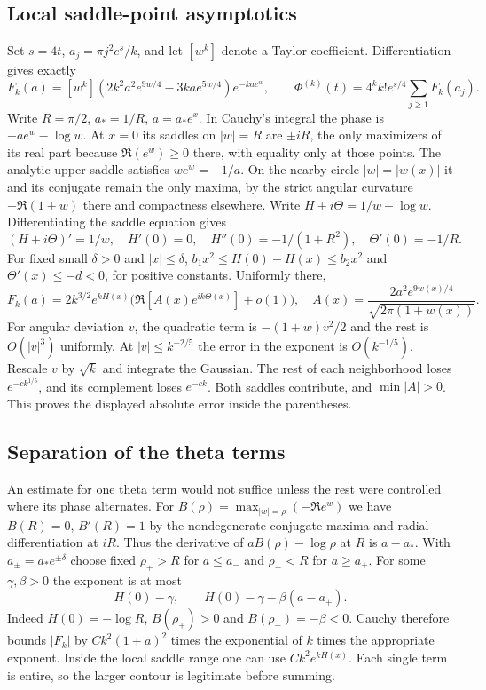 \documentclass[11pt,a4paper,reqno]{amsart}
\numberwithin{equation}{section}
\begin{document}
\subsection{Local saddle-point asymptotics}\label{sec:saddle}


Set \(s=4t\), \(a_j=\pi j^2 e^s/k\), and let \([w^k]\) denote a Taylor coefficient. Differentiation gives exactly \[ F_k(a)=[w^k](2k^2a^2 e^{9w/4}-3ka e^{5w/4})e^{-kae^w},\qquad
\Phi^{(k)}(t)=4^k k! e^{s/4}\sum_{j\ge1}F_k(a_j).\] Write \(R=\pi/2\), \(a_*=1/R\), \(a=a_*e^x\). In Cauchy's integral the phase is \(-ae^w-\log w\). At \(x=0\) its saddles on \(|w|=R\) are \(\pm iR\), the only maximizers of its real part because \(\Re(e^w)\ge0\) there, with equality only at those points. The analytic upper saddle satisfies \(we^w=-1/a\). On the nearby circle \(|w|=|w(x)|\) it and its conjugate remain the only maxima, by the strict angular curvature \(-\Re(1+w)\) there and compactness elsewhere. Write \(H+i\Theta=1/w-\log w\). Differentiating the saddle equation gives \[(H+i\Theta)'=1/w,\quad H'(0)=0,\quad H''(0)=-1/(1+R^2),\quad \Theta'(0)=-1/R.\] For fixed small \(\delta>0\) and \(|x|\le\delta\), \(b_1x^2\le H(0)-H(x)\le b_2x^2\) and \(\Theta'(x)\le-d<0\), for positive constants. Uniformly there, \[F_k(a)=2k^{3/2}e^{kH(x)}\big(\Re[A(x)e^{ik\Theta(x)}]+o(1)\big),\quad
 A(x)=\frac{2a^2 e^{9w(x)/4}}{\sqrt{2\pi(1+w(x))}}.\] For angular deviation \(v\), the quadratic term is \(-(1+w)v^2/2\) and the rest is \(O(|v|^3)\) uniformly. At \(|v|\le k^{-2/5}\) the error in the exponent is \(O(k^{-1/5})\). Rescale \(v\) by \(\sqrt{k}\) and integrate the Gaussian. The rest of each neighborhood loses \(e^{-c k^{1/5}}\), and its complement loses \(e^{-ck}\). Both saddles contribute, and \(\min|A|>0\). This proves the displayed absolute error inside the parentheses.

\subsection{Separation of the theta terms}\label{sec:count}


An estimate for one theta term would not suffice unless the rest were controlled where its phase alternates. For \(B(\rho)=\max_{|w|=\rho}(-\Re e^w)\) we have \(B(R)=0\), \(B'(R)=1\) by the nondegenerate conjugate maxima and radial differentiation at \(iR\). Thus the derivative of \(aB(\rho)-\log\rho\) at \(R\) is \(a-a_*\). With \(a_\pm=a_*e^{\pm\delta}\) choose fixed \(\rho_+>R\) for \(a\le a_-\) and \(\rho_-<R\) for \(a\ge a_+\). For some \(\gamma,\beta>0\) the exponent is at most \[H(0)-\gamma,\qquad H(0)-\gamma-\beta(a-a_+).\] Indeed \(H(0)=-\log R\), \(B(\rho_+)>0\) and \(B(\rho_-)=-\beta<0\). Cauchy therefore bounds \(|F_k|\) by \(Ck^2(1+a)^2\) times the exponential of \(k\) times the appropriate exponent. Inside the local saddle range one can use \(Ck^2e^{kH(x)}\). Each single term is entire, so the larger contour is legitimate before summing.
\end{document}

